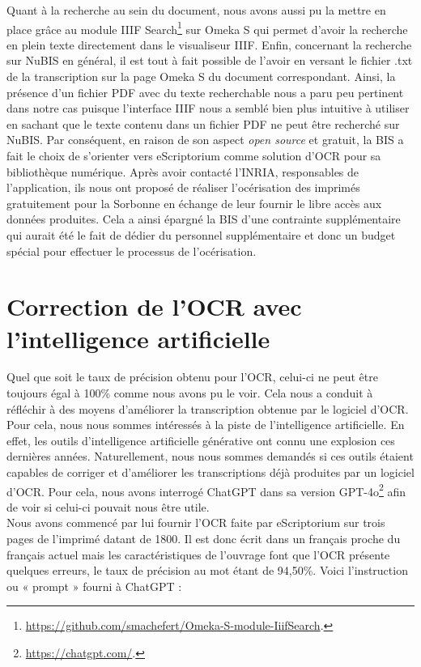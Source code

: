 \documentclass[a4paper,12pt,twoside]{book}
\begin{document}
Quant à la recherche au sein du document, nous avons aussi pu la mettre
en place grâce au module IIIF Search\footnote{\url{https://github.com/smachefert/Omeka-S-module-IiifSearch}.}
sur Omeka S qui permet d'avoir la recherche en plein texte directement
dans le visualiseur IIIF. Enfin, concernant la recherche sur NuBIS en
général, il est tout à fait possible de l'avoir en versant le fichier
.txt de la transcription sur la page Omeka S du document correspondant.
Ainsi, la présence d'un fichier PDF avec du texte recherchable nous a
paru peu pertinent dans notre cas puisque l'interface IIIF nous a semblé
bien plus intuitive à utiliser en sachant que le texte contenu dans un
fichier PDF ne peut être recherché sur NuBIS. Par conséquent, en raison
de son aspect \emph{open source} et gratuit, la BIS a fait le choix de
s'orienter vers eScriptorium comme solution d'OCR pour sa bibliothèque
numérique. Après avoir contacté l'INRIA, responsables de l'application,
ils nous ont proposé de réaliser l'océrisation des imprimés gratuitement
pour la Sorbonne en échange de leur fournir le libre accès aux données
produites. Cela a ainsi épargné la BIS d'une contrainte supplémentaire
qui aurait été le fait de dédier du personnel supplémentaire et donc un
budget spécial pour effectuer le processus de l'océrisation.

\section{Correction de l'OCR avec l'intelligence artificielle}

Quel que soit le taux de précision obtenu pour l'OCR, celui-ci ne peut
être toujours égal à 100\% comme nous avons pu le voir. Cela nous a
conduit à réfléchir à des moyens d'améliorer la transcription obtenue
par le logiciel d'OCR. Pour cela, nous nous sommes intéressés à la piste
de l'intelligence artificielle. En effet, les outils
d'intelligence artificielle générative ont connu une explosion ces
dernières années. Naturellement, nous nous sommes demandés si ces outils
étaient capables de corriger et d'améliorer les
transcriptions déjà produites par un logiciel d'OCR. Pour cela, nous
avons interrogé ChatGPT dans sa version GPT-4o\footnote{\url{https://chatgpt.com/}.}
afin de voir si celui-ci pouvait nous être utile. \\

Nous avons commencé par lui fournir l'OCR faite par eScriptorium sur
trois pages de l'imprimé datant de 1800. Il est donc écrit dans un
français proche du français actuel mais les caractéristiques de
l'ouvrage font que l'OCR présente quelques erreurs, le taux de précision
au mot étant de 94,50\%. Voici l'instruction ou « prompt » fourni à
ChatGPT : \\
\end{document}
